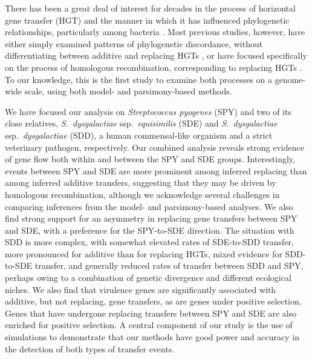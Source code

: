 \documentclass[12pt]{article}
\begin{document}
There has been a great deal of interest for decades in the process of
horizontal gene transfer (HGT) and the manner in which it has influenced
phylogenetic relationships, particularly among bacteria \citep{Koonin2001}.
Most previous studies, however, have either simply examined patterns of
phylogenetic discordance, without differentiating between additive and
replacing HGTs \citep[e.g.,][]{Lerat2005}, or have focused specifically on
the process of homologous recombination, corresponding to replacing HGTs
\citep{Didelot2007,Didelot2010}.  To our knowledge, this is the first study
to examine both processes on a genome-wide scale, using both model- and
parsimony-based methods.

We have focused our analysis on {\em Streptococcus pyogenes} (SPY) and two
of its close relatives, {\em S.\ dysgalactiae} ssp.\ {\em equisimilis}
(SDE) and {\em S.\ dysgalactiae} ssp.\ {\em dysgalactiae} (SDD), a human
commensal-like organism and a strict veterinary pathogen, respectively.
Our combined analysis reveals strong evidence of gene flow both within and
between the SPY and SDE groups.  Interestingly, events between SPY and SDE
are more prominent among inferred replacing than among inferred additive
transfers, suggesting that they may be driven by homologous recombination,
although we acknowledge several challenges in comparing inferences from the
model- and parsimony-based analyses.  We also find strong support for an
asymmetry in replacing gene transfers between SPY and SDE, with a
preference for the SPY-to-SDE direction.  The situation with SDD is more
complex, with somewhat elevated rates of SDE-to-SDD transfer, more
pronounced for additive than for replacing HGTs, mixed evidence for
SDD-to-SDE transfer, and generally reduced rates of transfer between SDD
and SPY, perhaps owing to a combination of genetic divergence and different
ecological niches.  We also find that virulence genes are significantly
associated with additive, but not replacing, gene transfers, as are genes
under positive selection.  Genes that have undergone replacing transfers
between SPY and SDE are also enriched for positive selection.  A central
component of our study is the use of simulations to demonstrate that our
methods have good power and accuracy in the detection of both types of
transfer events.
\end{document}
